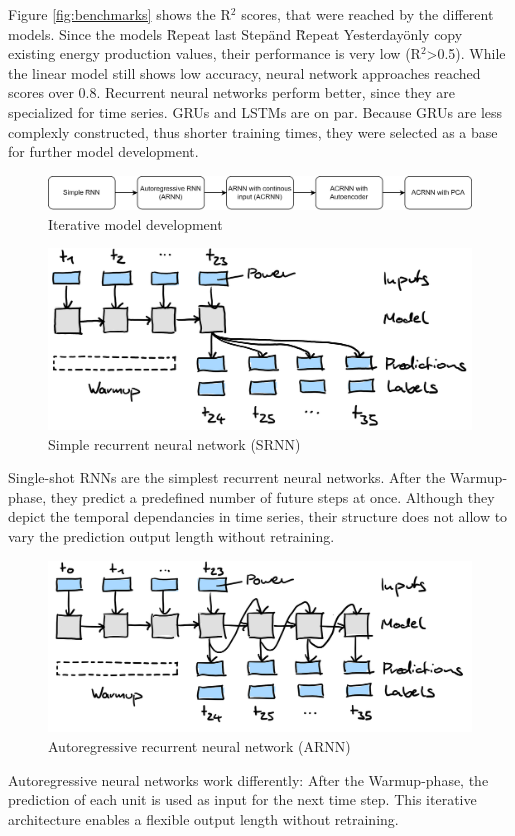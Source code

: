 \documentclass[11pt,table]{article}
\begin{document}
Figure \ref{fig:benchmarks} shows the R$^2$ scores, that were reached by the different models. Since the models \" Repeat last Step\" and \" Repeat Yesterday\" only copy existing energy production values, their performance is very low (R$^2$>0.5). While the linear model still shows low accuracy, neural network approaches reached scores over 0.8. Recurrent neural networks perform better, since they are specialized for time series. GRUs and LSTMs are on par. Because GRUs are less complexly constructed, thus shorter training times, they were selected as a base for further model development.

\begin{figure}[H]
	\centering
	\includegraphics[scale=1]{Figures/modelEvolution.png}
	\caption{Iterative model development}
	\label{fig:modelEvo}
\end{figure}

\begin{figure}[H]
	\centering
	\includegraphics[scale=1]{Figures/SRNN.png}
	\caption{Simple recurrent neural network (SRNN)}
	\label{fig:SRNN}
\end{figure}
Single-shot RNNs are the simplest recurrent neural networks. After the Warmup-phase, they predict a predefined number of future steps at once. Although they depict the temporal dependancies in time series, their structure does not allow to vary the prediction output length without retraining.
\begin{figure}[H]
	\centering
	\includegraphics[scale=1]{Figures/ARNN.png}
	\caption{Autoregressive recurrent neural network (ARNN)}
	\label{fig:ARNN}
\end{figure}
Autoregressive neural networks work differently: After the Warmup-phase, the prediction of each unit is used as input for the next time step. This iterative architecture enables a flexible output length without retraining.\\
\end{document}
